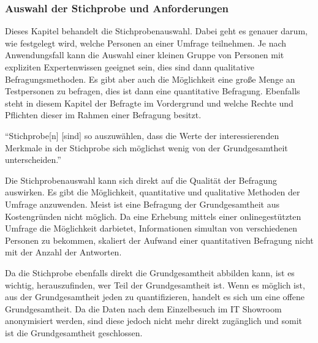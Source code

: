 \subsubsection{Auswahl der Stichprobe und Anforderungen}
Dieses Kapitel behandelt die Stichprobenauswahl. Dabei geht es genauer darum, wie festgelegt wird, welche Personen an einer Umfrage teilnehmen.
Je nach Anwendungsfall kann die Auswahl einer kleinen Gruppe von Personen mit expliziten Expertenwissen geeignet sein, dies sind dann qualitative Befragungsmethoden. Es gibt aber auch die Möglichkeit eine große Menge an Testpersonen zu befragen, dies ist dann eine quantitative Befragung.
Ebenfalls steht in diesem Kapitel der Befragte im Vordergrund und welche Rechte und Pflichten dieser im Rahmen einer Befragung besitzt. 

\enquote{Stichprobe[n] [sind] so auszuwählen, dass die Werte der interessierenden Merkmale in der Stichprobe sich möglichst wenig von der Grundgesamtheit unterscheiden.} \autocite{Interview}


Die Stichprobenauswahl kann sich direkt auf die Qualität der Befragung auswirken.
Es gibt die Möglichkeit, quantitative und qualitative Methoden der Umfrage anzuwenden.
Meist ist eine Befragung der Grundgesamtheit aus Kostengründen nicht möglich. 
Da eine Erhebung mittels einer onlinegestützten Umfrage die Möglichkeit darbietet, Informationen simultan von verschiedenen Personen zu bekommen, skaliert der Aufwand einer quantitativen Befragung nicht mit der Anzahl der Antworten\autocite{Multi}. %

Da die Stichprobe ebenfalls direkt die Grundgesamtheit abbilden kann, ist es wichtig, herauszufinden, wer Teil der Grundgesamtheit ist. 
Wenn es möglich ist, aus der Grundgesamtheit jeden zu quantifizieren, handelt es sich um eine offene Grundgesamtheit. 
Da die Daten nach dem Einzelbesuch im IT Showroom anonymisiert werden, sind diese jedoch nicht mehr direkt zugänglich und somit ist die Grundgesamtheit geschlossen.	



